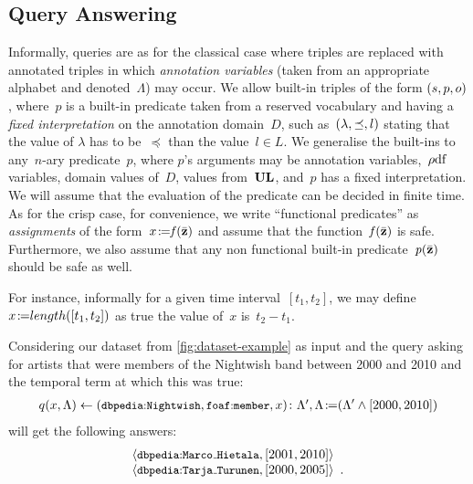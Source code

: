 \subsection{Query Answering} 
\label{aqa}
%
Informally, queries are as for the classical case where triples are replaced with annotated triples in which
\emph{annotation variables} (taken from an appropriate alphabet and denoted~$\Lambda$) may occur.  We allow built-in
triples of the form $(s,p,o)$, where~$p$ is a built-in predicate taken from a reserved vocabulary and having a
\emph{fixed interpretation} on the annotation domain~$D$, such as~$(\lambda, \preceq , l)$ stating that the value
of $\lambda$ has to be~$\preceq$ than the value~$l \in L$. We generalise the built-ins to any~$n$-ary predicate~$p$,
where $p$'s arguments may be annotation variables,~$\mbox{$\rho$df}$ variables, domain values of~$D$, values from~$\mathbf{UL}$, and~$p$
has a fixed interpretation. We will assume that the evaluation of the predicate can be decided in finite time. As for
the crisp case, for convenience, we write ``functional predicates'' as \emph{assignments} of the form~$x\mbox{$\colon\!\!\!\!=$}
\mathit{f}\!\left(\bar{\mathbf z}\right)$ and assume that the function~$\mathit{f}\!\left(\bar{\mathbf z}\right)$ is safe. Furthermore, we also assume that
any non functional built-in predicate~$\mathit{p}\!\left(\bar{\mathbf z}\right)$ should be safe as well.

For instance, informally for a given time interval~$[t_{1}, t_{2}]$, we may define~$x\mbox{$\colon\!\!\!\!=$} length([t_{1}, t_{2}])$ as
true \iff the value of~$x$ is~$t_{2} - t_{1}$.

\begin{example}
  \label{exUs4}
  \noindent Considering our dataset from \cref{fig:dataset-example} as input and the query asking for artists that
  were members of the Nightwish band between 2000 and 2010 and the temporal term at which this was true:
  \vspace{-\abovedisplayskip}
  \begin{align*}
    q(x, \Lambda) \leftarrow \mbox{$(\mbox{\small$\mathtt{dbpedia{:}Nightwish}$}, \mbox{\small$\mathtt{foaf{:}member}$}, x)\colon\Lambda'$},
    \Lambda\mbox{$\colon\!\!\!\!=$} (\Lambda' \land [2000,2010]) 
  \end{align*}
  \noindent will get the following answers:
  \[ \begin{array}{l}
    \tuple{\qname{dbpedia}{Marco\mathunderscore{}Hietala}, [2001, 2010]}\\
    \tuple{\qname{dbpedia}{Tarja\mathunderscore{}Turunen}, [2000, 2005]} \enspace .
  \end{array} \]
\end{example}

